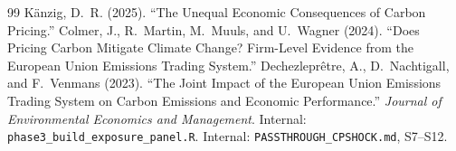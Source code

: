 \documentclass[11pt]{article}
\begin{document}
\begin{thebibliography}{99}
 K\"anzig, D.~R. (2025). ``The Unequal Economic Consequences of Carbon Pricing.''
 Colmer, J., R.~Martin, M.~Muuls, and U.~Wagner (2024). ``Does Pricing Carbon Mitigate Climate Change? Firm-Level Evidence from the European Union Emissions Trading System.''
 Dechezlepr\^etre, A., D.~Nachtigall, and F.~Venmans (2023). ``The Joint Impact of the European Union Emissions Trading System on Carbon Emissions and Economic Performance.'' \emph{Journal of Environmental Economics and Management}.
 Internal: \texttt{phase3\_build\_exposure\_panel.R}.
 Internal: \texttt{PASSTHROUGH\_CPSHOCK.md}, S7--S12.
\end{thebibliography}
\end{document}
